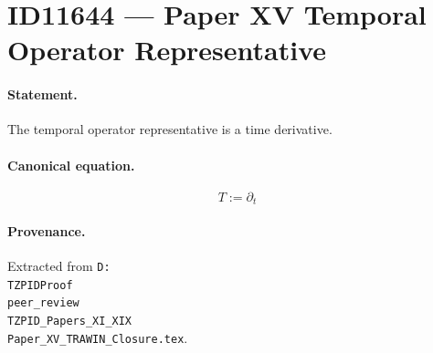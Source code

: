 \section*{ID11644 --- Paper XV Temporal Operator Representative}

\paragraph{Statement.}
The temporal operator representative is a time derivative.

\paragraph{Canonical equation.}
\[
T:=\partial_t
\]

\paragraph{Provenance.}
Extracted from \texttt{D:\\TZPIDProof\\peer\_review\\TZPID\_Papers\_XI\_XIX\\Paper\_XV\_TRAWIN\_Closure.tex}.
